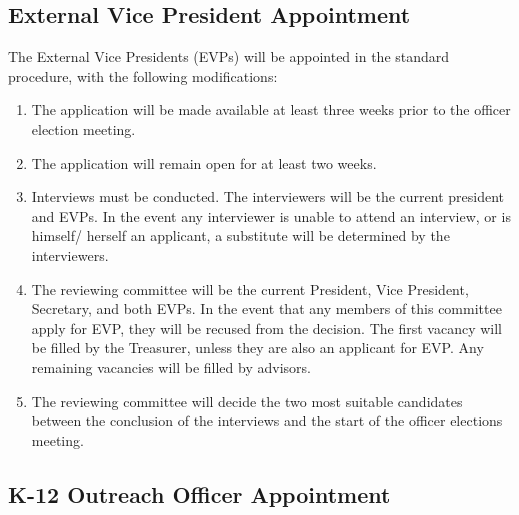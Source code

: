 \subsection{External Vice President Appointment} \label{IV.3}

The External Vice Presidents
(EVPs) will be appointed in the standard procedure, with the following modifications:
\begin{enumerate}
    \item The application will be made available at least three weeks prior to the officer election
meeting.
    \item The application will remain open for at least two weeks.
    \item Interviews must be conducted. The interviewers will be the current president and
EVPs. In the event any interviewer is unable to attend an interview, or is himself/
herself an applicant, a substitute will be determined by the interviewers.
    \item The reviewing committee will be the current President, Vice President, Secretary, and
both EVPs. In the event that any members of this committee apply for EVP, they will
be recused from the decision. The first vacancy will be filled by the Treasurer, unless
they are also an applicant for EVP. Any remaining vacancies will be filled by advisors.
    \item The reviewing committee will decide the two most suitable candidates between the
conclusion of the interviews and the start of the officer elections meeting.
\end{enumerate}


\subsection{K-12 Outreach Officer Appointment} \label{IV.4}

